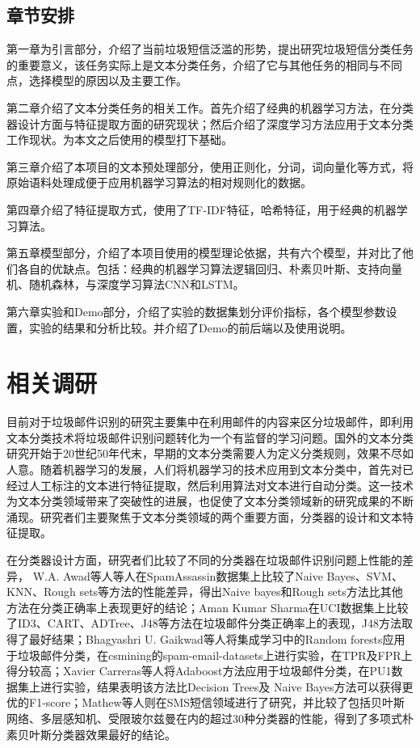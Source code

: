 \documentclass[a4paper]{article}
\begin{document}
\subsection{章节安排}
第一章为引言部分，介绍了当前垃圾短信泛滥的形势，提出研究垃圾短信分类任务的重要意义，该任务实际上是文本分类任务，介绍了它与其他任务的相同与不同点，选择模型的原因以及主要工作。

第二章介绍了文本分类任务的相关工作。首先介绍了经典的机器学习方法，在分类器设计方面与特征提取方面的研究现状；然后介绍了深度学习方法应用于文本分类工作现状。为本文之后使用的模型打下基础。

第三章介绍了本项目的文本预处理部分，使用正则化，分词，词向量化等方式，将原始语料处理成便于应用机器学习算法的相对规则化的数据。

第四章介绍了特征提取方式，使用了TF-IDF特征，哈希特征，用于经典的机器学习算法。

第五章模型部分，介绍了本项目使用的模型理论依据，共有六个模型，并对比了他们各自的优缺点。包括：经典的机器学习算法逻辑回归、朴素贝叶斯、支持向量机、随机森林，与深度学习算法CNN和LSTM。

第六章实验和Demo部分，介绍了实验的数据集划分评价指标，各个模型参数设置，实验的结果和分析比较。并介绍了Demo的前后端以及使用说明。


\section{相关调研} \label{relatedwork}%
目前对于垃圾邮件识别的研究主要集中在利用邮件的内容来区分垃圾邮件，即利用文本分类技术将垃圾邮件识别问题转化为一个有监督的学习问题\cite{r1}。国外的文本分类研究开始于20世纪50年代末，早期的文本分类需要人为定义分类规则，效果不尽如人意。随着机器学习的发展，人们将机器学习的技术应用到文本分类中，首先对已经过人工标注的文本进行特征提取，然后利用算法对文本进行自动分类。这一技术为文本分类领域带来了突破性的进展，也促使了文本分类领域新的研究成果的不断涌现。研究者们主要聚焦于文本分类领域的两个重要方面，分类器的设计和文本特征提取。

在分类器设计方面，研究者们比较了不同的分类器在垃圾邮件识别问题上性能的差异，
W.A. Awad等人\cite{r5}等人在SpamAssassin数据集上比较了Naive Bayes、SVM、KNN、Rough sets等方法的性能差异，得出Naive bayes和Rough sets方法比其他方法在分类正确率上表现更好的结论；Aman Kumar Sharma\cite{sharma2011comparative}在UCI数据集上比较了ID3、CART、ADTree、J48等方法在垃圾邮件分类正确率上的表现，J48方法取得了最好结果；Bhagyashri U. Gaikwad\cite{Bhagyashri_ijacect}等人将集成学习中的Random forests应用于垃圾邮件分类，在csmining的spam-email-datasets上进行实验，在TPR及FPR上得分较高；Xavier Carreras等人\cite{carreras2001boosting}将Adaboost方法应用于垃圾邮件分类，在PU1数据集上进行实验，结果表明该方法比Decision Trees及 Naive Bayes方法可以获得更优的F1-score；Mathew等人则在SMS短信领域进行了研究\cite{mathew2011intelligent}，并比较了包括贝叶斯网络、多层感知机、受限玻尔兹曼在内的超过30种分类器的性能，得到了多项式朴素贝叶斯分类器效果最好的结论。
\end{document}

